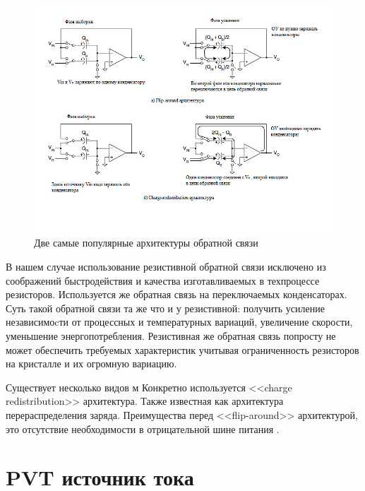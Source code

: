 \documentclass[a4paper,12pt]{article} %
\begin{document}
\begin{figure}[H]
    \includegraphics[width=\textwidth]{Dve_arkhitektury.jpg}
    \caption{Две самые популярные архитектуры обратной связи}
    \label{pic:feedback}
\end{figure}



В нашем случае использование резистивной обратной связи исключено из соображений быстродействия и качества изготавливаемых в техпроцессе резисторов. Используется же обратная связь на переключаемых конденсаторах. 
Суть такой обратной связи та же что и у резистивной: получить усиление независимоcти от процессных  и температурных вариаций, увеличение скорости, уменьшение энергопотребления. Резистивная же обратная связь попросту не может обеспечить требуемых характеристик учитывая ограниченность резисторов на кристалле и их огромную вариацию.\cite{swiched_caps}

Существует несколько видов м
Конкретно используется <<charge redistribution>> архитектура. Также известная как архитектура перераспределения заряда.
Преимущества перед  <<flip-around>> архитектурой, это отсутствие необходимости в отрицательной шине питания . 






\section{PVT источник тока}
\end{document}
